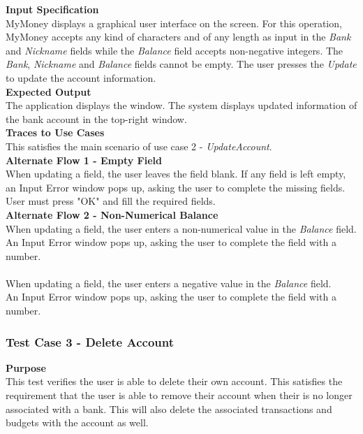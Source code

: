 \documentclass[12pt]{article}
\begin{document}
\noindent
{\bf Input Specification}\\
            MyMoney displays a graphical user interface on the screen.
            For this operation, MyMoney accepts any kind of characters and of any length as
            input in the \textit{Bank} and \textit{Nickname} fields while the \textit{Balance} field accepts non-negative integers.
            The \textit{Bank}, \textit{Nickname} and \textit{Balance} fields cannot be empty. The user presses the \textit{Update} to update the account information.\\
            
\noindent
{\bf Expected Output}\\
    The application displays the window.    
    The system displays updated information of the bank account in the top-right window.\\

 \noindent
 {\bf Traces to Use Cases}\\
     This satisfies the main scenario of use case 2 - \textit{UpdateAccount}.\\
     
\noindent
{\bf Alternate Flow 1 - Empty Field}\\
When updating a field, the user leaves the field blank.
If any field is left empty, an Input Error window pops up, asking the user to complete the missing fields. User must press "OK" and fill the required fields.\\

\noindent
{\bf Alternate Flow 2 - Non-Numerical Balance}\\
When updating a field, the user enters a non-numerical value in the \textit{Balance} field. \\
An Input Error window pops up, asking the user to complete the field with a number. \\

\\
When updating a field, the user enters a negative value in the \textit{Balance} field. \\
An Input Error window pops up, asking the user to complete the field with a number. \\
                 
\clearpage   


\subsubsection{Test Case 3 - Delete Account} \label{TC-3}
\noindent
{\bf Purpose}\\
 This test verifies the user is able to delete their own account.
 This satisfies the requirement that the user is able to remove their account when their is no longer associated
 with a bank. This will also delete the associated transactions and budgets with the account as well.\\
\end{document}
